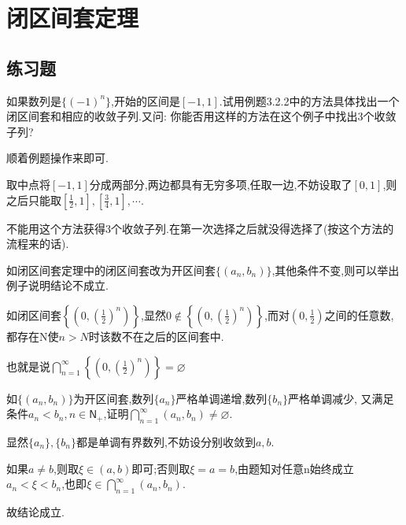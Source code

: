 \documentclass[cn,chinese,fontset]{elegantbook}
\begin{document}
        \section{闭区间套定理}
            \subsection{练习题}
            \begin{exercise}
                如果数列是$\{(-1)^n\}$,开始的区间是$[-1,1]$.试用例题3.2.2中的方法具体找出一个闭区间套和相应的收敛子列.又问: 你能否用这样的方法在这个例子中找出3个收敛子列?
            \end{exercise}
            \begin{solution}
                顺着例题操作来即可.

                取中点将$[-1,1]$分成两部分,两边都具有无穷多项,任取一边,不妨设取了$[0,1]$,则之后只能取$[\frac{1}{2},1],[\frac{3}{4},1],\cdots$.

                不能用这个方法获得3个收敛子列.在第一次选择之后就没得选择了(按这个方法的流程来的话).
            \end{solution}

            \begin{exercise}
                如闭区间套定理中的闭区间套改为开区间套$\{(a_n,b_n)\}$,其他条件不变,则可以举出例子说明结论不成立.
            \end{exercise}
            \begin{solution}
                如闭区间套$\left\{(0,(\frac{1}{2})^n)\right\}$,显然$0\notin\left\{(0,(\frac{1}{2})^n)\right\}$,而对$(0,\frac{1}{2})$之间的任意数,都存在N使$n>N$时该数不在之后的区间套中.

                也就是说$\textstyle\bigcap_{n=1}^\infty\left\{(0,(\frac{1}{2})^n)\right\}=\varnothing $
            \end{solution}

            \begin{exercise}
                如$\{(a_n,b_n)\}$为开区间套,数列$\{a_n\}$严格单调递增,数列$\{b_n\}$严格单调减少,
                又满足条件$a_n<b_n,n\in \mathsf{N}_+$,证明$\textstyle\bigcap_{n=1}^\infty(a_n,b_n)\neq\varnothing$.
            \end{exercise}
            \begin{solution}
                显然$\{a_n\},\{b_n\}$都是单调有界数列,不妨设分别收敛到$a,b$.

                如果$a\neq b$,则取$\xi \in (a,b)$即可;否则取$\xi=a=b$,由题知对任意n始终成立$a_n<\xi<b_n$,也即$\xi\in\textstyle\bigcap_{n=1}^\infty(a_n,b_n)$.

                故结论成立.
            \end{solution}
\end{document}
